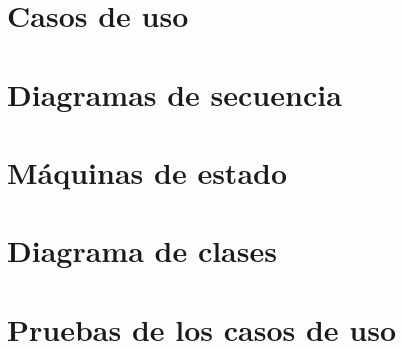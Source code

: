 \documentclass[a4paper,11pt,oneside]{article}
\begin{document}
\section{Casos de uso}

\section{Diagramas de secuencia}

\section{Máquinas de estado}

\section{Diagrama de clases}

\section{Pruebas de los casos de uso}
\end{document}
